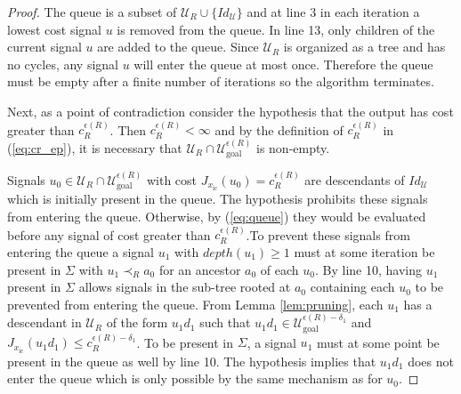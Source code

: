 \documentclass{llncs}
\begin{document}
\begin{proof}
The queue is a subset of $\mathcal{U}_R\cup \{Id_\mathcal{U} \}$ and at line 3 in each iteration a lowest cost signal $u$ is removed from the queue. 
%
In line 13, only children of the current signal $u$ are added to the queue. Since $\mathcal{U}_R$ is organized as a tree and has no cycles, any signal $u$ will enter the queue at most once.
%
Therefore the queue must be empty after a finite number of iterations so the algorithm terminates.

Next, as a point of contradiction consider the hypothesis that the output has cost greater than $c_R^{\epsilon(R)}$. 
%
Then $c_R^{\epsilon(R)}<\infty$ and by the definition of  $c_R^{\epsilon(R)}$  in (\ref{eq:cr_ep}), it is necessary that $\mathcal{U}_{R}\cap \mathcal{U}_\mathrm{goal}^{\epsilon(R)}$ is non-empty. 

Signals $u_0\in \mathcal{U}_{R}\cap\mathcal{U}_\mathrm{goal}^{\epsilon(R)}$ with cost $J_{x_\mathrm{ic}}(u_0)=c_R^{\epsilon(R)}$ are descendants of $Id_\mathcal{U}$ which is initially present in the queue. 
%
The hypothesis prohibits these signals from entering the queue. Otherwise, by (\ref{eq:queue}) they would be evaluated before any signal of cost greater than $c_R^{\epsilon(R)}$.To prevent these signals from entering the queue a signal $u_1$  with $depth(u_1)\geq 1$ must at some iteration be present in $\Sigma$ with $u_1 \prec_R a_0$ for an ancestor $a_0$ of each $u_0$. 
%
By line 10, having $u_1$ present in $\Sigma$ allows signals in the sub-tree rooted at $a_0$ containing each $u_0$ to be prevented from entering the queue. 
%
From Lemma \ref{lem:pruning}, each $u_1$ has a descendant in $\mathcal{U}_R$ of the form $u_1d_1$ such that $u_1d_1\in \mathcal{U}_\mathrm{goal}^{\epsilon(R)-\delta_1}$ and $J_{x_\mathrm{ic}}(u_1d_1)\leq c_R^{\epsilon(R)-\delta_1}$. 
%
To be present in $\Sigma$, a signal $u_1$ must at some point be present in the queue as well by line 10. 
%
The hypothesis implies that $u_1d_1$ does not enter the queue which is only possible by the same mechanism as for $u_0$.
%

%
%


\end{proof}
\end{document}

